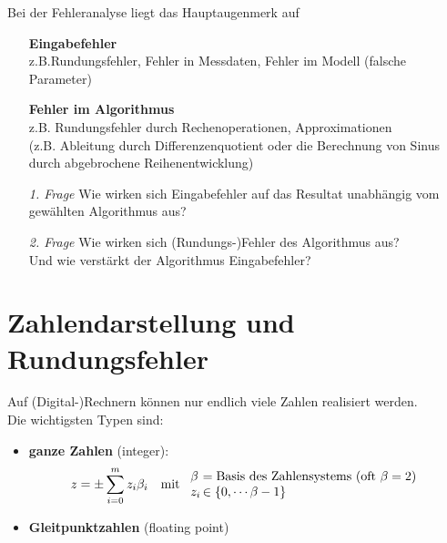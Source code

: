 \documentclass[ngerman,fontsize=11pt, paper=a4, parskip=half, titlepage=true, toc=bib]{scrbook}
\newcommand{\sectione}[1]{\section{#1} \setcounter{equation}{0}}
\begin{document}
Bei der Fehleranalyse liegt das Hauptaugenmerk auf
\begin{itemize}
\item[] \textbf{Eingabefehler}\\ z.B.Rundungsfehler, Fehler in Messdaten, Fehler im Modell (falsche Parameter)
\item[] \textbf{Fehler im Algorithmus} \\ z.B. Rundungsfehler durch Rechenoperationen, Approximationen \\
  (z.B. Ableitung durch Differenzenquotient oder die Berechnung von Sinus durch abgebrochene Reihenentwicklung)
  \\
\item[\textit{1. Frage}] Wie wirken sich Eingabefehler auf das Resultat unabhängig vom gewählten Algorithmus aus?
\item[\textit{2. Frage}]Wie wirken sich (Rundungs-)Fehler des Algorithmus aus?\\
  Und wie verstärkt der Algorithmus Eingabefehler?
\end{itemize}


\sectione{Zahlendarstellung und Rundungsfehler} \label{3.1}  
Auf (Digital-)Rechnern können nur endlich viele Zahlen realisiert werden. \\
Die wichtigsten Typen sind: 
\begin{itemize}
\item \textbf{ganze Zahlen}  (integer):
  \begin{align*}
    z&=\pm \sum_{i=0}^{m}z_i\beta_i & \text{mit }
                                      \begin{array}{l@{\,}l}
                                        \beta &= \text{Basis des Zahlensystems (oft $\beta=2$)} \\
                                        z_i &\in \{0, \cdots \beta-1\}
                                      \end{array}
  \end{align*}
\item \textbf{Gleitpunktzahlen} (floating point) 
\end{itemize}
\end{document}
